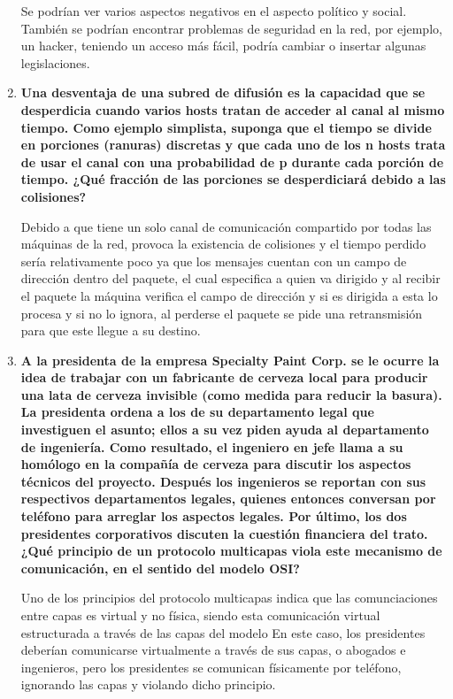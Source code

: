 \documentclass[a4paper,12pt]{article}
\begin{document}
\begin{enumerate}
Se podrían ver varios aspectos negativos en el aspecto político y social. También se podrían encontrar problemas
de seguridad en la red, por ejemplo, un hacker, teniendo un acceso más fácil, podría cambiar o insertar algunas
legislaciones.

 \item \textbf{Una desventaja de una subred de difusión es la capacidad que se desperdicia cuando varios hosts tratan de acceder
al canal al mismo tiempo. Como ejemplo simplista, suponga que el tiempo se divide en porciones (ranuras)
discretas y que cada uno de los n hosts trata de usar el canal con una probabilidad de p durante cada porción de
tiempo. ¿Qué fracción de las porciones se desperdiciará debido a las colisiones?}

Debido a que tiene un solo canal de comunicación compartido por todas las máquinas de la red, provoca la existencia de colisiones y el tiempo perdido sería relativamente poco ya que los mensajes cuentan con un campo de dirección dentro del paquete, el cual especifica a quien va dirigido y al recibir el paquete la máquina verifica el campo de dirección y si es dirigida a esta lo procesa y si no lo ignora, al perderse el paquete se pide una retransmisión para que este llegue a su destino.


 \item \textbf{A la presidenta de la empresa Specialty Paint Corp. se le ocurre la idea de trabajar con un fabricante de cerveza
local para producir una lata de cerveza invisible (como medida para reducir la basura). La presidenta ordena
a los de su departamento legal que investiguen el asunto; ellos a su vez piden ayuda al departamento de ingeniería.
Como resultado, el ingeniero en jefe llama a su homólogo en la compañía de cerveza para discutir los
aspectos técnicos del proyecto. Después los ingenieros se reportan con sus respectivos departamentos legales,
quienes entonces conversan por teléfono para arreglar los aspectos legales. Por último, los dos presidentes
corporativos discuten la cuestión financiera del trato. ¿Qué principio de un protocolo multicapas viola este
mecanismo de comunicación, en el sentido del modelo OSI?}

Uno de los principios del protocolo multicapas indica que las comunciaciones entre capas
es virtual y no física, siendo esta comunicación virtual estructurada a través de las capas del modelo
En este caso, los presidentes deberían comunicarse virtualmente a través de sus capas, o abogados e ingenieros, pero
los presidentes se comunican físicamente por teléfono, ignorando las capas y violando dicho principio.


\end{enumerate}
\end{document}

